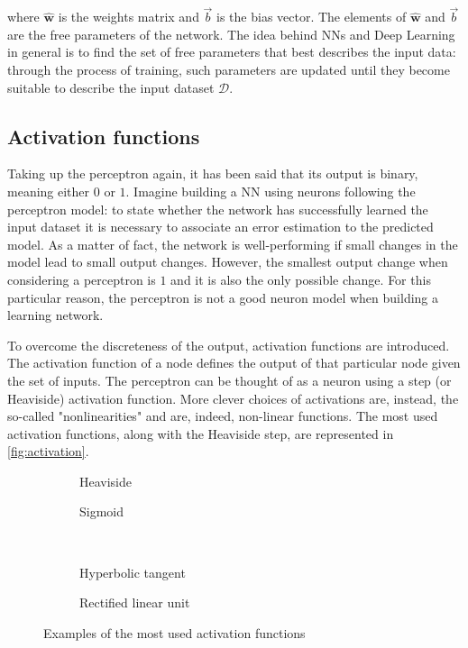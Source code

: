 \noindent where $\hat{\mathbf{w}}$ is the weights matrix and $\vec{b}$ is the bias vector. The elements of
$\hat{\mathbf{w}}$ and $\vec{b}$ are the free parameters of the network. The idea behind NNs and Deep Learning in
general is to find the set of free parameters that best describes the input data: through the process of training, such
parameters are updated until they become suitable to describe the input dataset $\mathcal{D}$.


\subsection{Activation functions}

Taking up the perceptron again, it has been said that its output is binary, meaning either $0$ or $1$. Imagine building
a NN using neurons following the perceptron model: to state whether the network has successfully learned the input
dataset it is necessary to associate an error estimation to the predicted model. As a matter of fact, the network is
well-performing if small changes in the model lead to small output changes. However, the smallest output change when
considering a perceptron is $1$ and it is also the only possible change. For this particular reason, the perceptron is
not a good neuron model when building a learning network. 

To overcome the discreteness of the output, activation functions are introduced. The activation function of a node
defines the output of that particular node given the set of inputs. The perceptron can be thought of as a neuron using a
step (or Heaviside) activation function. More clever choices of activations are, instead, the so-called "nonlinearities"
and are, indeed, non-linear functions. The most used activation functions, along with the Heaviside step, are
represented in \autoref{fig:activation}.

\begin{figure}[t]
    \begin{subfigure}[b]{0.5\textwidth}
        \centering 
        
        \caption{Heaviside}
        \label{fig:activation:a}
    \end{subfigure}%
    \hfill
    \begin{subfigure}[b]{0.5\textwidth}
        \centering 
        
        \caption{Sigmoid}
        \label{fig:activation:b}
    \end{subfigure}%
    \\
    \begin{subfigure}[b]{0.5\textwidth}
        \centering 
		  
        \caption{Hyperbolic tangent}
        \label{fig:activation:c}
    \end{subfigure}%
    \hfill
    \begin{subfigure}[b]{0.5\textwidth}
        \centering 
        
        \caption{Rectified linear unit}
        \label{fig:activation:d}
    \end{subfigure}%
    \caption{Examples of the most used activation functions}
    \label{fig:activation}
\end{figure}

